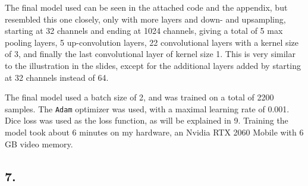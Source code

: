 \documentclass[a4paper, 12pt]{article}
\begin{document}
The final model used can be seen in the attached code and the appendix, but resembled this one closely, only with more layers and down- and upsampling, starting at 32 channels and ending at 1024 channels, giving a total of 5 max pooling layers, 5 up-convolution layers, 22 convolutional layers with a kernel size of 3, and finally the last convolutional layer of kernel size 1. This is very similar to the illustration in the slides, except for the additional layers added by starting at 32 channels instead of 64. 

The final model used a batch size of 2, and was trained on a total of 2200 samples. The \texttt{Adam} optimizer was used, with a maximal learning rate of 0.001. Dice loss was used as the loss function, as will be explained in 9. Training the model took about 6 minutes on my hardware, an Nvidia RTX 2060 Mobile with 6 GB video memory.

%
%			
%			
%			
%			
%						
%						
%


\subsection{7.}
\end{document}
